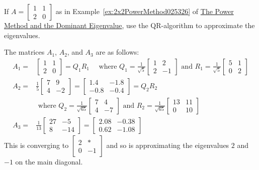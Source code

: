 \documentclass{ximera}
\begin{document}
\begin{example}\label{QR-algortihm-2x2-025425}
If $A = \left[ \begin{array}{rr}
1 & 1 \\
2 & 0
\end{array}\right]$ as in Example~\ref{ex:2x2PowerMethod025326} of \href{}{The Power Method and the Dominant Eigenvalue}, use the QR-algorithm to approximate the eigenvalues.
    
\begin{explanation}
    The matrices $A_{1}$, $A_{2}$, and $A_{3}$ are as follows:
\begin{align*}
A_{1} = & \left[ \begin{array}{rr}
1 & 1 \\
2 & 0
\end{array}\right] = Q_{1}R_{1} \quad \mbox{ where } Q_{1} = \frac{1}{\sqrt{5}}\left[ \begin{array}{rr}
1 & 2 \\
2 & -1
\end{array}\right] \mbox{ and } R_{1} =  \frac{1}{\sqrt{5}}\left[ \begin{array}{rr}
5 & 1 \\
0 & 2
\end{array}\right] \\
A_{2} = & \frac{1}{5}\left[ \begin{array}{rr}
7 & 9 \\
4 & -2
\end{array}\right] = \left[ \begin{array}{rr}
1.4 & -1.8 \\
-0.8 & -0.4
\end{array}\right]= Q_{2}R_{2} \\
&\mbox{ where } Q_{2} = \frac{1}{\sqrt{65}}\left[ \begin{array}{rr}
7 & 4 \\
4 & -7
\end{array}\right] \mbox{ and } R_{2} =  \frac{1}{\sqrt{65}}\left[ \begin{array}{rr}
13 & 11 \\
0 & 10
\end{array}\right] \\
A_{3} = &\frac{1}{13}\left[ \begin{array}{rr}
27 & -5 \\
8 & -14
\end{array}\right] = \left[ \begin{array}{rr}
2.08 & -0.38 \\
0.62 & -1.08
\end{array}\right]
\end{align*}
This is converging to $\left[ \begin{array}{rr}
2 & \ast \\
0 & -1
\end{array}\right]$ and so is approximating the eigenvalues $2$ and $-1$ on the main diagonal.
\end{explanation}
\end{example}
    
\end{document}

